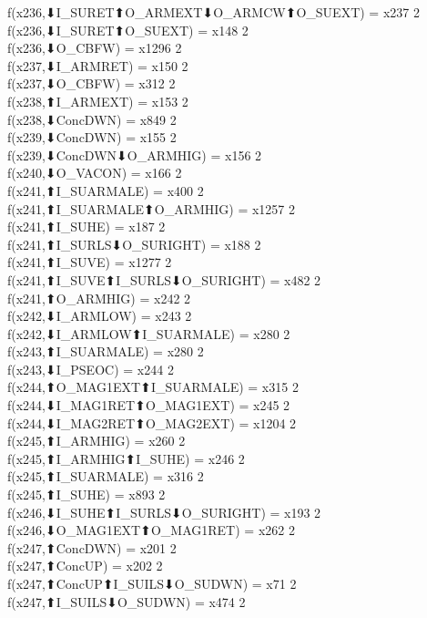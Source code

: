 f(x236,⬇I_SURET⬆O_ARMEXT⬇O_ARMCW⬆O_SUEXT) = x237 {2} \\
f(x236,⬇I_SURET⬆O_SUEXT) = x148 {2} \\
f(x236,⬇O_CBFW) = x1296 {2} \\
f(x237,⬇I_ARMRET) = x150 {2} \\
f(x237,⬇O_CBFW) = x312 {2} \\
f(x238,⬆I_ARMEXT) = x153 {2} \\
f(x238,⬇ConcDWN) = x849 {2} \\
f(x239,⬇ConcDWN) = x155 {2} \\
f(x239,⬇ConcDWN⬇O_ARMHIG) = x156 {2} \\
f(x240,⬇O_VACON) = x166 {2} \\
f(x241,⬆I_SUARMALE) = x400 {2} \\
f(x241,⬆I_SUARMALE⬆O_ARMHIG) = x1257 {2} \\
f(x241,⬆I_SUHE) = x187 {2} \\
f(x241,⬆I_SURLS⬇O_SURIGHT) = x188 {2} \\
f(x241,⬆I_SUVE) = x1277 {2} \\
f(x241,⬆I_SUVE⬆I_SURLS⬇O_SURIGHT) = x482 {2} \\
f(x241,⬆O_ARMHIG) = x242 {2} \\
f(x242,⬇I_ARMLOW) = x243 {2} \\
f(x242,⬇I_ARMLOW⬆I_SUARMALE) = x280 {2} \\
f(x243,⬆I_SUARMALE) = x280 {2} \\
f(x243,⬇I_PSEOC) = x244 {2} \\
f(x244,⬆O_MAG1EXT⬆I_SUARMALE) = x315 {2} \\
f(x244,⬇I_MAG1RET⬆O_MAG1EXT) = x245 {2} \\
f(x244,⬇I_MAG2RET⬆O_MAG2EXT) = x1204 {2} \\
f(x245,⬆I_ARMHIG) = x260 {2} \\
f(x245,⬆I_ARMHIG⬆I_SUHE) = x246 {2} \\
f(x245,⬆I_SUARMALE) = x316 {2} \\
f(x245,⬆I_SUHE) = x893 {2} \\
f(x246,⬇I_SUHE⬆I_SURLS⬇O_SURIGHT) = x193 {2} \\
f(x246,⬇O_MAG1EXT⬆O_MAG1RET) = x262 {2} \\
f(x247,⬆ConcDWN) = x201 {2} \\
f(x247,⬆ConcUP) = x202 {2} \\
f(x247,⬆ConcUP⬆I_SUILS⬇O_SUDWN) = x71 {2} \\
f(x247,⬆I_SUILS⬇O_SUDWN) = x474 {2} \\

